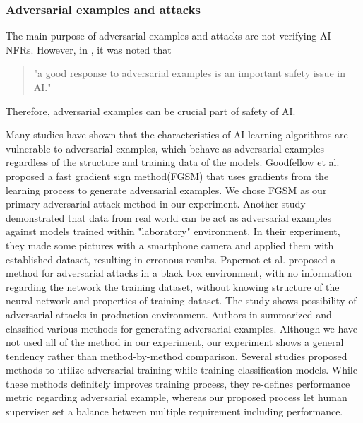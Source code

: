 \documentclass[symmetry,article,submit,moreauthors,pdftex]{Definitions/mdpi}
\begin{document}
\subsubsection{Adversarial examples and attacks}

The main purpose of adversarial examples and attacks are not verifying AI NFRs.
However, in \cite{adversarial-kurakin}, it was noted that

\begin{quote}
   "a good response to adversarial examples is an important safety issue in AI."
\end{quote}

Therefore, adversarial examples can be crucial part of safety of AI.

Many studies have shown that the characteristics of AI learning algorithms are vulnerable to adversarial examples, which behave as adversarial examples regardless of the structure and training data of the models\cite{adversarial-szegedy,adversarial-goodfellow}.
Goodfellow et al. \cite{adversarial-goodfellow} proposed a fast gradient sign method(FGSM) that uses gradients from the learning process to generate adversarial examples. We chose FGSM as our primary adversarial attack method in our experiment.
Another study \cite{adversarial-kurakin2} demonstrated that data from real world can be act as adversarial examples against models trained within "laboratory" environment. In their experiment, they made some pictures with a smartphone camera and applied them with established dataset, resulting in erronous results.
Papernot et al. \cite{adversarial-papernot} proposed a method for adversarial attacks in a black box environment, with no information regarding the network the training dataset, without knowing structure of the neural network and properties of training dataset. The study shows possibility of adversarial attacks in production environment.
Authors in \cite{adversarial-yuan} summarized and classified various methods for generating adversarial examples. Although we have not used all of the method in our experiment, our experiment shows a general tendency rather than method-by-method comparison.
Several studies \cite{adversarial-poon,adversarial-terzi,adversarial-dong} proposed methods to utilize adversarial training while training classification models. While these methods definitely improves training process, they re-defines performance metric regarding adversarial example, whereas our proposed process let human superviser set a balance between multiple requirement including performance.
\end{document}

